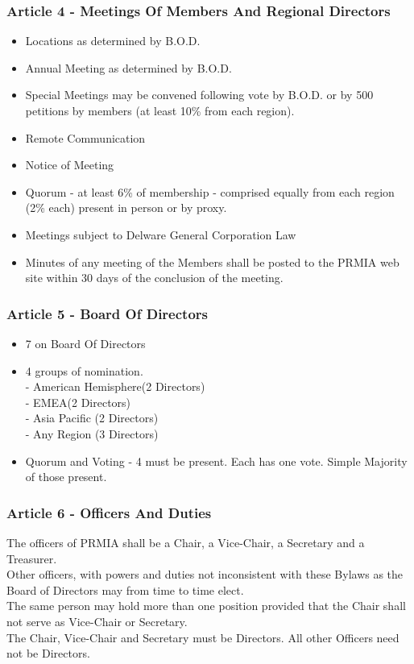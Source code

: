 \subsubsection{Article 4 - Meetings Of Members And Regional
Directors} \begin{itemize}\item Locations as determined by
B.O.D.\item Annual Meeting as determined by B.O.D. \item Special
Meetings may be convened following vote by B.O.D. or by 500
petitions by members (at least 10\% from each region). \item
Remote Communication \item Notice of Meeting \item Quorum - at
least 6\% of membership - comprised equally from each region (2\%
each) present in person or by proxy.\item Meetings subject to
Delware General Corporation Law \item Minutes of any meeting of
the Members shall be posted to the PRMIA web site within 30 days
of the conclusion of the meeting.
\end{itemize}
\subsubsection{Article 5 - Board Of Directors}
\begin{itemize}
\item 7 on Board Of Directors \item 4 groups of nomination.
\\- American Hemisphere(2 Directors)
\\- EMEA(2 Directors)
\\- Asia Pacific (2 Directors)
\\- Any Region (3 Directors)
\item Quorum and Voting - 4 must be present. Each has one vote.
Simple Majority of those present.
\end{itemize}
\subsubsection{Article 6 - Officers And Duties}
The officers of PRMIA shall be a Chair, a Vice-Chair, a Secretary
and a Treasurer.\\Other officers, with powers and duties not
inconsistent with these Bylaws as the Board of Directors may from
time to time elect. \\The same person may hold more than one
position provided that the Chair shall not serve as Vice-Chair or
Secretary. \\The Chair, Vice-Chair and Secretary must be
Directors. All other Officers need not be Directors.

